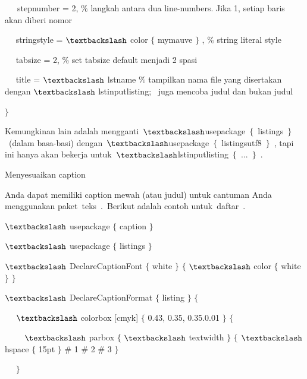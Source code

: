 ~~~stepnumber = 2, $\%$ langkah antara dua line-numbers.  Jika 1, setiap baris akan diberi nomor\par

~~ stringstyle = $\textbackslash$ color $ \{ $ mymauve $ \} $ , $\%$ string literal style\par

~~ tabsize = 2, $\%$ set tabsize default menjadi 2 spasi\par

~~ title = $\textbackslash$ lstname $\%$ tampilkan nama file yang disertakan dengan $\textbackslash$ lstinputlisting;~ juga mencoba judul dan bukan judul\par

 $ \} $\par

Kemungkinan lain adalah mengganti $\textbackslash$usepackage $ \{ $ listings $ \} $ (dalam basa-basi) dengan $\textbackslash$usepackage $ \{ $ listingsutf8 $ \} $ , tapi ini hanya akan bekerja untuk $\textbackslash$lstinputlisting $ \{ $ ... $ \} $ .\par

Menyesuaikan caption \par

Anda dapat memiliki caption mewah (atau judul) untuk cantuman Anda menggunakan paket teks . Berikut adalah contoh untuk daftar .\par

 $\textbackslash$ usepackage $ \{ $ caption $ \} $\par

 $\textbackslash$ usepackage $ \{ $ listings $ \} $\par

 $\textbackslash$ DeclareCaptionFont $ \{ $ white $ \} $ $ \{ $ $\textbackslash$ color $ \{ $ white $ \} $ $ \} $\par

 $\textbackslash$ DeclareCaptionFormat $ \{ $ listing $ \} $ $ \{ $\par

~~ $\textbackslash$ colorbox [cmyk] $ \{ $ 0.43, 0.35, 0.35.0.01 $ \} $ $ \{ $\par

~~~~ $\textbackslash$ parbox $ \{ $ $\textbackslash$ textwidth $ \} $ $ \{ $ $\textbackslash$ hspace $ \{ $ 15pt $ \} $ $\#$ 1 $\#$ 2 $\#$ 3 $ \} $\par

~~ $ \} $\par

